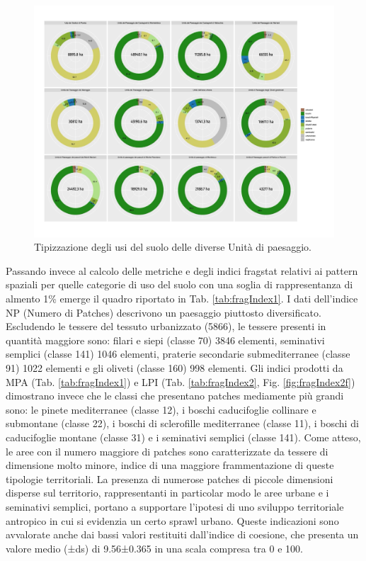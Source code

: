 \documentclass[
]{book}
\begin{document}
\begin{figure}

{\centering \includegraphics[width=\linewidth]{./figs/RECSpoleto_unitaPaesaggioPlot} 

}

\caption{Tipizzazione degli usi del suolo delle diverse Unità di paesaggio.}\label{fig:unitaPaes}
\end{figure}

Passando invece al calcolo delle metriche e degli indici fragstat relativi ai pattern spaziali per quelle categorie di uso del suolo con una soglia di rappresentanza di almento 1\% emerge il quadro riportato in Tab.
\ref{tab:fragIndex1}.
I dati dell'indice NP (Numero di Patches) descrivono un paesaggio piuttosto diversificato.
Escludendo le tessere del tessuto urbanizzato (5866), le tessere presenti in quantità maggiore sono: filari e siepi (classe 70) 3846 elementi, seminativi semplici (classe 141) 1046 elementi, praterie secondarie submediterranee (classe 91) 1022 elementi e gli oliveti (classe 160) 998 elementi.
Gli indici prodotti da MPA (Tab. \ref{tab:fragIndex1}) e LPI (Tab. \ref{tab:fragIndex2}, Fig. \ref{fig:fragIndex2f}) dimostrano invece che le classi che presentano patches mediamente più grandi sono: le pinete mediterranee (classe 12), i boschi caducifoglie collinare e submontane (classe 22), i boschi di sclerofille mediterranee (classe 11), i boschi di caducifoglie montane (classe 31) e i seminativi semplici (classe 141).
Come atteso, le aree con il numero maggiore di patches sono caratterizzate da tessere di dimensione molto minore, indice di una maggiore frammentazione di queste tipologie territoriali.
La presenza di numerose patches di piccole dimensioni disperse sul territorio, rappresentanti in particolar modo le aree urbane e i seminativi semplici, portano a supportare l'ipotesi di uno sviluppo territoriale antropico in cui si evidenzia un certo sprawl urbano.
Queste indicazioni sono avvalorate anche dai bassi valori restituiti dall'indice di coesione, che presenta un valore medio (±ds) di 9.56±0.365 in una scala compresa tra 0 e 100.
\end{document}
